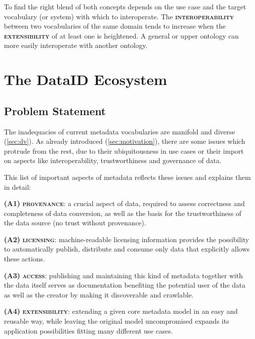 \documentclass[a4paper,english,twoside,BCOR1.5cm,headsepline,DIV12,appendixprefix,final,12pt]{scrbook}
\newcommand{\provenance}{{\ttfamily\scshape\bfseries provenance}\xspace}
\newcommand{\licensing}{{\ttfamily\scshape\bfseries licensing}\xspace}
\newcommand{\access}{{\ttfamily\scshape\bfseries access}\xspace}
\newcommand{\extensibility}{{\ttfamily\scshape\bfseries extensibility}\xspace}
\newcommand{\interoperability}{{\ttfamily\scshape\bfseries interoperability}\xspace}
\begin{document}
To find the right blend of both concepts depends on the use case and the target vocabulary (or system) with which to interoperate. The \interoperability between two vocabularies of the same domain tends to increase when the \extensibility of at least one is heightened. A general or upper ontology can more easily interoperate with another ontology.

\chapter{The DataID Ecosystem}
\label{chap:ecosystem}

\section{Problem Statement} 
\label{sec:probstat}

The inadequacies of current metadata vocabularies are manifold and diverse (\cref{sec:dv}). As already introduced (\cref{sec:motivation}), there are some issues which protrude from the rest, due to their ubiquitousness in use cases or their import on aspects like interoperability, trustworthiness and governance of data.

This list of important aspects of metadata reflects these issues and explains them in detail:

\textbf{(A1)} \provenance: a crucial aspect of data, required to assess correctness and completeness of data conversion, as well as the basis for the trustworthiness of the data source (no trust without provenance). 

\textbf{(A2)} \licensing: machine-readable licensing information provides the possibility to automatically
publish, distribute and consume only data that explicitly allows these actions. 

\textbf{(A3)} \access: publishing and maintaining
this kind of metadata together with the data itself serves as
documentation benefiting the potential user
of the data as well as the creator by making it discoverable
and crawlable. 

\textbf{(A4)} \extensibility: extending a given core metadata model
in an easy and reusable way, while leaving the original model uncompromised expands its application possibilities fitting many
different use cases. 
\end{document}
